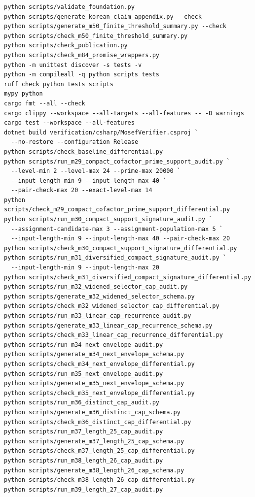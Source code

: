 \documentclass[11pt]{article}
\begin{document}
\begin{verbatim}
python scripts/validate_foundation.py
python scripts/generate_korean_claim_appendix.py --check
python scripts/generate_m50_finite_threshold_summary.py --check
python scripts/check_m50_finite_threshold_summary.py
python scripts/check_publication.py
python scripts/check_m84_promise_wrappers.py
python -m unittest discover -s tests -v
python -m compileall -q python scripts tests
ruff check python tests scripts
mypy python
cargo fmt --all --check
cargo clippy --workspace --all-targets --all-features -- -D warnings
cargo test --workspace --all-features
dotnet build verification/csharp/MosefVerifier.csproj `
  --no-restore --configuration Release
python scripts/check_baseline_differential.py
python scripts/run_m29_compact_cofactor_prime_support_audit.py `
  --level-min 2 --level-max 24 --prime-max 20000 `
  --input-length-min 9 --input-length-max 40 `
  --pair-check-max 20 --exact-level-max 14
python scripts/check_m29_compact_cofactor_prime_support_differential.py
python scripts/run_m30_compact_support_signature_audit.py `
  --assignment-candidate-max 3 --assignment-population-max 5 `
  --input-length-min 9 --input-length-max 40 --pair-check-max 20
python scripts/check_m30_compact_support_signature_differential.py
python scripts/run_m31_diversified_compact_signature_audit.py `
  --input-length-min 9 --input-length-max 20
python scripts/check_m31_diversified_compact_signature_differential.py
python scripts/run_m32_widened_selector_cap_audit.py
python scripts/generate_m32_widened_selector_schema.py
python scripts/check_m32_widened_selector_cap_differential.py
python scripts/run_m33_linear_cap_recurrence_audit.py
python scripts/generate_m33_linear_cap_recurrence_schema.py
python scripts/check_m33_linear_cap_recurrence_differential.py
python scripts/run_m34_next_envelope_audit.py
python scripts/generate_m34_next_envelope_schema.py
python scripts/check_m34_next_envelope_differential.py
python scripts/run_m35_next_envelope_audit.py
python scripts/generate_m35_next_envelope_schema.py
python scripts/check_m35_next_envelope_differential.py
python scripts/run_m36_distinct_cap_audit.py
python scripts/generate_m36_distinct_cap_schema.py
python scripts/check_m36_distinct_cap_differential.py
python scripts/run_m37_length_25_cap_audit.py
python scripts/generate_m37_length_25_cap_schema.py
python scripts/check_m37_length_25_cap_differential.py
python scripts/run_m38_length_26_cap_audit.py
python scripts/generate_m38_length_26_cap_schema.py
python scripts/check_m38_length_26_cap_differential.py
python scripts/run_m39_length_27_cap_audit.py

\end{verbatim}
\end{document}
